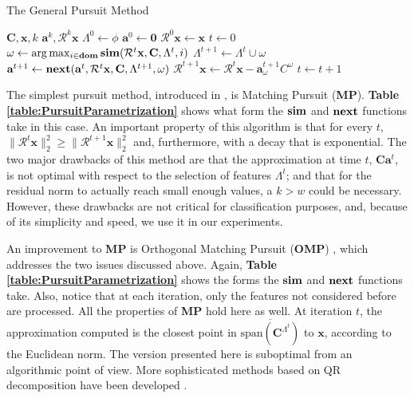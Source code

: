 \documentclass[runningheads,a4paper]{llncs}
\begin{document}
\begin{algorithm}[h!]
\caption{The General Pursuit Method}
\label{algo:Pursuit}
\begin{algorithmic}
\Require $\textbf{C},\textbf{x},k$
\Ensure $\textbf{a}^k,\mathcal{R}^k\textbf{x}$
\State $\Lambda^0 \gets \phi$
\State $\textbf{a}^0 \gets \textbf{0}$
\State $\mathcal{R}^0\textbf{x} \gets \textbf{x}$
\State $t \gets 0$
\State $\omega \gets \arg \max_{i \in \textbf{dom}} \text{\textbf{sim}}(\mathcal{R}^t\textbf{x},\textbf{C},\Lambda^t,i)$
\State $\Lambda^{t+1} \gets \Lambda^t \cup \omega$
\State $\textbf{a}^{t+1} \gets \text{\textbf{next}}(\textbf{a}^t,\mathcal{R}^t\textbf{x},\textbf{C},\Lambda^{t+1},\omega)$
\State $\mathcal{R}^{t+1}\textbf{x} \gets \mathcal{R}^t\textbf{x} - \textbf{a}^{t+1}_\omega C^\omega$
\State $t \gets t + 1$
\EndWhile
\end{algorithmic}
\end{algorithm}

The simplest pursuit method, introduced in \cite{matchingpursuit1}, is Matching Pursuit (\textbf{MP}). \textbf{Table \ref{table:PursuitParametrization}} shows what form the $\text{\textbf{sim}}$ and $\text{\textbf{next}}$ functions take in this case. An important property of this algorithm is that for every $t$, $\|\mathcal{R}^t\textbf{x}\|_2^2 \geq \|\mathcal{R}^{t+1}\textbf{x}\|_2^2$ and, furthermore, with a decay that is exponential. The two major drawbacks of this method are that the approximation at time $t$, $\textbf{C}\textbf{a}^t$, is not optimal with respect to the selection of features $\Lambda^t$; and that for the residual norm to actually reach small enough values, a $k > w$ could be necessary. However, these drawbacks are not critical for classification purposes, and, because of its simplicity and speed, we use it in our experiments.

An improvement to \textbf{MP} is Orthogonal Matching Pursuit (\textbf{OMP}) \cite{matchingpursuit2,orthopursuit,pursuitdifferences}, which addresses the two issues discussed above. Again, \textbf{Table \ref{table:PursuitParametrization}} shows the forms the $\text{\textbf{sim}}$ and $\text{\textbf{next}}$ functions take. Also, notice that at each iteration, only the features not considered before are processed. All the properties of \textbf{MP} hold here as well. At iteration $t$, the approximation computed is the closest point in $\overline{\text{span}(\textbf{C}^{\Lambda^t})}$ to $\textbf{x}$, according to the Euclidean norm. The version presented here is suboptimal from an algorithmic point of view. More sophisticated methods based on QR decomposition have been developed \cite{matchingpursuit2,pursuitdifferences}.
\end{document}
